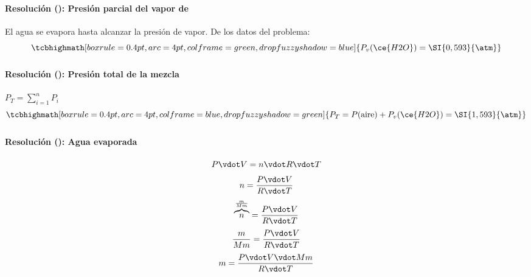 \begin{frame}
    \frametitle{\ejerciciocmd}
    \framesubtitle{Resolución (): Presión parcial del vapor de }
     El agua se evapora hasta alcanzar la presión de vapor. De los datos del problema:
    $$
        \tcbhighmath[boxrule=0.4pt,arc=4pt,colframe=green,drop fuzzy shadow=blue]{P_v(\ce{H2O}) = \SI{0,593}{\atm}}
    $$
\end{frame}

\begin{frame}
    \frametitle{\ejerciciocmd}
    \framesubtitle{Resolución (): Presión total de la mezcla}
     $P_T = \sum_{i=1}^{n}P_i$
    $$
        \tcbhighmath[boxrule=0.4pt,arc=4pt,colframe=blue,drop fuzzy shadow=green]{P_T = P(\text{aire}) + P_v(\ce{H2O}) = \SI{1,593}{\atm}}
    $$
\end{frame}

\begin{frame}
    \frametitle{\ejerciciocmd}
    \framesubtitle{Resolución (): Agua evaporada}
    \begin{overprint}
            $$
                P\vdot V = n\vdot R\vdot T
            $$
            $$
                n = \frac{P\vdot V}{R\vdot T}
            $$
            $$
                \overbrace{n}^{\frac{m}{Mm}} = \frac{P\vdot V}{R\vdot T}
            $$
            $$
                \frac{m}{Mm} = \frac{P\vdot V}{R\vdot T}
            $$
            $$
                m = \frac{P\vdot V\vdot Mm}{R\vdot T}
            $$
    \end{overprint}
\end{frame}

